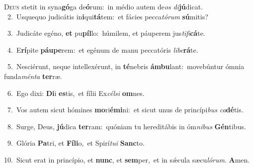 \lettrine{\initial\textcolor{\initialcolor}{D}}{eus} stetit in syna\-\textbf{gó}\-ga de\-\textbf{ó}\-rum:~\star in médio autem de\textit{os} \textit{di}\-\textbf{jú}dicat.\\
{\numbfont\textcolor{\numbcolor}{~2.}}~Usquequo judicátis in\-\textbf{i}\-qui\-\textbf{tá}\-tem:~\star et fácies pecca\-\textit{tó}\-\textit{rum} \textbf{sú}\-mitis?\par
{\numbfont\textcolor{\numbcolor}{~3.}}~Judicáte egéno, \textbf{et} pu\-\textbf{píl}\-lo:~\star húmilem, et páuperem jus\-\textit{ti}\-\textit{fi}\textbf{cá}te.\par
{\numbfont\textcolor{\numbcolor}{~4.}}~E\-\textbf{rí}\-pite \textbf{páu}\-\textbf{pe}rem:~\star et egénum de manu peccatóris \textit{li}\-\textit{be}\textbf{rá}te.\par
{\numbfont\textcolor{\numbcolor}{~5.}}~Nesciérunt, neque intellexérunt, in \textbf{té}\-nebris \textbf{ám}\-\textbf{bu}lant:~\star movebúntur ómnia funda\-\textit{mén}\-\textit{ta} \textbf{ter}\-ræ.\par
{\numbfont\textcolor{\numbcolor}{~6.}}~Ego dixi: \textbf{Di}\-i \textbf{es}\-tis,~\star et fílii Ex\-\textit{cél}\-\textit{si} \textbf{om}\-nes.\par
{\numbfont\textcolor{\numbcolor}{~7.}}~Vos autem sicut hómines \textbf{mo}\-ri\-\textbf{é}\-\textbf{mi}ni:~\star et sicut unus de princípi\textit{bus} \textit{ca}\-\textbf{dé}tis.\par
{\numbfont\textcolor{\numbcolor}{~8.}}~Surge, Deus, \textbf{jú}\-dica \textbf{ter}\-ram:~\star quóniam tu hereditábis in óm\-\textit{ni}\-\textit{bus} \textbf{Gén}\-tibus.\par
{\numbfont\textcolor{\numbcolor}{~9.}}~Glória \textbf{Pa}\-tri, et \textbf{Fí}\-\textbf{li}o,~\star et Spirí\-\textit{tu}\-\textit{i} \textbf{Sanc}\-to.\par
{\numbfont\textcolor{\numbcolor}{10.}}~Sicut erat in princípio, et \textbf{nunc}\-, et \textbf{sem}\-per,~\star et in sǽcula sæcu\-\textit{ló}\-\textit{rum}. \textbf{A}\-men.\par
